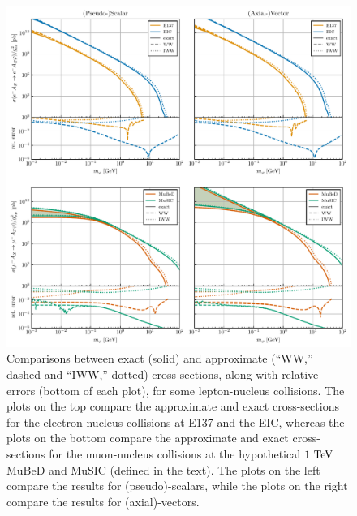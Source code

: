 \begin{figure}[t!]
    \centering
    \includegraphics[trim={2.5cm 0 2.5cm 0}, width=0.9\linewidth]{figures/chapter4/crossx_approximations_diagonal.pdf}
    \caption[Comparisons between cross-sections computed exactly and via the Weiz\"acker-Williams and Improved Weizs\"acker-Williams approximations for the process $\ell A_Z \rightarrow \ell A_Z \varphi$ at various lepton-nucleus collision experiments.]{Comparisons between exact (solid) and approximate (``WW,'' dashed and ``IWW,'' dotted) cross-sections, along with relative errors (bottom of each plot), for some lepton-nucleus collisions. The plots on the top compare the approximate and exact cross-sections for the electron-nucleus collisions at E137 and the EIC, whereas the plots on the bottom compare the approximate and exact cross-sections for the muon-nucleus collisions at the hypothetical $1~{\rm TeV}$ MuBeD and MuSIC (defined in the text). The plots on the left compare the results for (pseudo)-scalars, while the plots on the right compare the results for (axial)-vectors. }
    \label{fig:WW_diagonal}
\end{figure}
\clearpage

